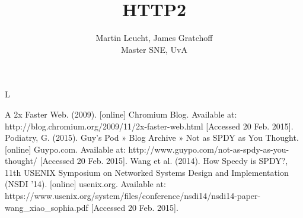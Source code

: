 \documentclass{article}
\begin{document}
 
\begin{figure}[!bh]
 	\begin{center}
		\huge \title{HTTP2}
		\author{ Martin Leucht, James Gratchoff \\
		Master SNE, UvA} 
	\maketitle 
		\label{sec:uva}
	\end{center}
\end{figure}L
\setlength{\columnsep}{2cm}
\def\columnseprulecolor{\color{blue}}
 
\begin{multicols}{2}








\begin{thebibliography}
A 2x Faster Web. (2009). [online] Chromium Blog. Available at: http://blog.chromium.org/2009/11/2x-faster-web.html [Accessed 20 Feb. 2015].
Podiatry, G. (2015). Guy's Pod » Blog Archive » Not as SPDY as You Thought. [online] Guypo.com. Available at: http://www.guypo.com/not-as-spdy-as-you-thought/ [Accessed 20 Feb. 2015].
Wang et al. (2014). How Speedy is SPDY?, 11th USENIX Symposium on Networked Systems Design and Implementation (NSDI ’14). [online] usenix.org. Available at:
https://www.usenix.org/system/files/conference/nsdi14/nsdi14-paper-wang_xiao_sophia.pdf [Accessed 20 Feb. 2015].

\end{thebibliography}
\newpage
\appendix

\end{multicols}
\end{document}
